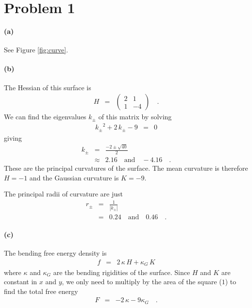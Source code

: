 \documentclass[12pt]{article}
\newcommand{\fig}[1]{Figure \ref{fig:#1}}
\begin{document}
\section{Problem 1}

\paragraph{(a)}

See \fig{curve}.


\paragraph{(b)}

The Hessian of this surface is
\begin{eqnarray}
H &=& \left( \begin{array}{cc}
    2 & 1 \\
    1 & -4
\end{array}\right) \quad.
\end{eqnarray}
We can find the eigenvalues $k_\pm$ of this matrix by solving
\begin{eqnarray}
{k_\pm}^2 + 2\,k_\pm - 9 &=& 0
\end{eqnarray}
giving
\begin{eqnarray}
k_\pm &=& \frac{-2 \pm \sqrt{40}}{2} \\
&\approx& 2.16 \quad \mathrm{and} \quad  -4.16 \quad.
\end{eqnarray}
These are the principal curvatures of the surface.
The mean curvature is therefore $H = -1$ and the Gaussian curvature is $K
= -9$.

The principal radii of curvature are just
\begin{eqnarray}
r_\pm &=& \frac{1}{|k_\pm|} \\
&=& 0.24 \quad \mathrm{and} \quad 0.46 \quad.
\end{eqnarray}


\paragraph{(c)}

The bending free energy density is
\begin{eqnarray}
f &=& 2\,\kappa\,H + \kappa_G\,K
\end{eqnarray}
where $\kappa$ and $\kappa_G$ are the bending rigidities of the surface.
Since $H$ and $K$ are constant in $x$ and $y$, we only need to multiply by the
area of the square ($1$) to find the total free energy
\begin{eqnarray}
F &=& -2\,\kappa - 9 \kappa_G \quad.
\end{eqnarray}
\end{document}
